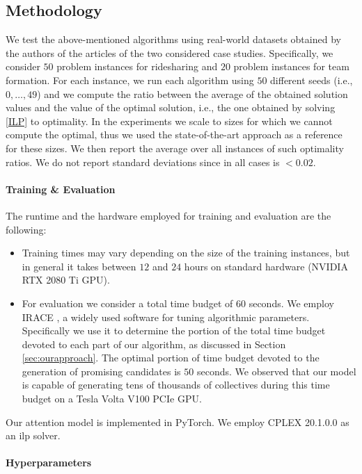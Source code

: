 \documentclass{article}
\theoremstyle{definition}
\begin{document}
\subsection{Methodology}

We test the above-mentioned algorithms using real-world datasets obtained by the authors of the articles of the two considered case studies.
Specifically, we consider $50$ problem instances for ridesharing and $20$ problem instances for team formation.
For each instance, we run each algorithm using $50$ different seeds (i.e., $0,\ldots,49$) and we compute the ratio between the average of the obtained solution values and the value of the optimal solution, i.e., the one obtained by solving \eqref{ILP} to optimality. In the experiments we scale to sizes for which we cannot compute the optimal, thus we used the state-of-the-art approach as a reference for these sizes.
We then report the average over all instances of such optimality ratios.
We do not report standard deviations since in all cases is $< 0.02$.

\paragraph{Training \& Evaluation}

The runtime and the hardware employed for training and evaluation are the following:

\begin{itemize}
    \item Training times may vary depending on the size of the training instances, but in general it takes between $12$ and $24$ hours on standard hardware (NVIDIA RTX 2080 Ti GPU).
    \item For evaluation we consider a total time budget of $60$ seconds. We employ IRACE \cite{lopez2016irace}, a widely used software for tuning algorithmic parameters. Specifically we use it to determine the portion of the total time budget devoted to each part of our algorithm, as discussed in Section \ref{sec:ourapproach}. The optimal portion of time budget devoted to the generation of promising candidates is $50$ seconds. We observed that our model is capable of generating tens of thousands of collectives during this time budget on a Tesla Volta V100 PCIe GPU.
\end{itemize}
Our attention model is implemented in PyTorch. We employ CPLEX 20.1.0.0 as an \gls{ilp} solver.

\paragraph{Hyperparameters}
\end{document}
